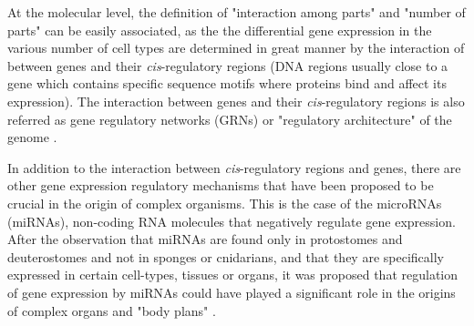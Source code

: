 
At the molecular level, the definition of "interaction among parts" and "number of parts" can be easily associated, as the the differential gene expression in the various number of cell types are determined in great manner by the interaction of between genes and their \textit{cis}-regulatory regions (DNA regions usually close to a gene which contains specific sequence motifs where proteins bind and affect its expression).
%
The interaction between genes and their \textit{cis}-regulatory regions is also referred as gene regulatory networks (GRNs) or "regulatory architecture" of the genome \citep{Davidson2001}.



In addition to the interaction between \textit{cis}-regulatory regions and genes, there are other gene expression regulatory mechanisms that have been proposed to be crucial in the origin of complex organisms.
This is the case of the microRNAs (miRNAs),
non-coding RNA molecules that negatively regulate gene expression.
After the observation that miRNAs are found only in protostomes and deuterostomes and not in sponges or cnidarians, and that they are specifically expressed in certain cell-types, tissues or organs, it was proposed that regulation of gene expression by miRNAs could have played a significant role in the origins of complex organs and "body plans" \citep{Sempere2006}.

